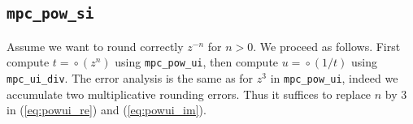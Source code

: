 \documentclass [12pt]{article}
\newcommand {\round}{\operatorname {\circ}}
\begin{document}
\subsection {\texttt {mpc\_pow\_si}}

Assume we want to round correctly $z^{-n}$ for $n > 0$. We proceed as follows.
First compute $t = \round(z^n)$ using \texttt {mpc\_pow\_ui}, then
compute $u = \round(1/t)$ using \texttt {mpc\_ui\_div}.
The error analysis is the same as for $z^3$ in \texttt {mpc\_pow\_ui},
indeed we accumulate two multiplicative rounding errors.
Thus it suffices to replace $n$ by $3$ in (\ref{eq:powui_re}) and
(\ref{eq:powui_im}).



\end{document}
